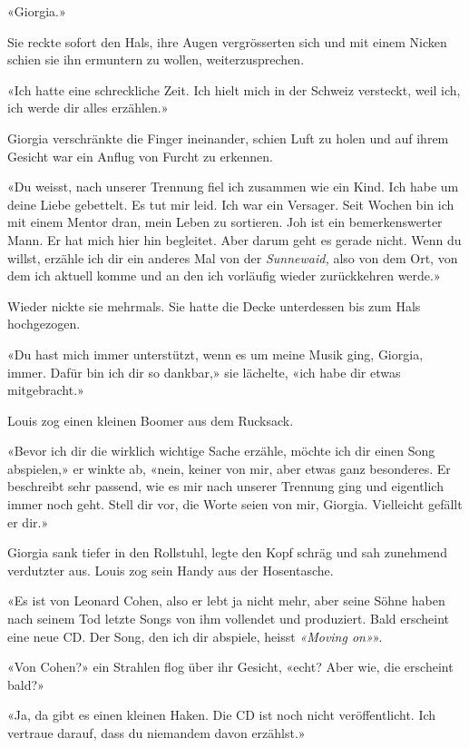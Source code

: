 «Giorgia.»

Sie reckte sofort den Hals, ihre Augen vergrösserten sich und mit einem
Nicken schien sie ihn ermuntern zu wollen, weiterzusprechen.

«Ich hatte eine schreckliche Zeit. Ich hielt mich in der Schweiz
versteckt, weil ich, ich werde dir alles erzählen.»

Giorgia verschränkte die Finger ineinander, schien Luft zu holen und auf
ihrem Gesicht war ein Anflug von Furcht zu erkennen.

«Du weisst, nach unserer Trennung fiel ich zusammen wie ein Kind. Ich
habe um deine Liebe gebettelt. Es tut mir leid. Ich war ein Versager.
Seit Wochen bin ich mit einem Mentor dran, mein Leben zu sortieren. Joh
ist ein bemerkenswerter Mann. Er hat mich hier hin begleitet. Aber darum
geht es gerade nicht. Wenn du willst, erzähle ich dir ein anderes Mal
von der \emph{Sunnewaid,} also von dem Ort, von dem ich aktuell komme
und an den ich vorläufig wieder zurückkehren werde.»

Wieder nickte sie mehrmals. Sie hatte die Decke unterdessen bis zum Hals hochgezogen.

«Du hast mich immer unterstützt, wenn es um meine Musik ging, Giorgia,
immer. Dafür bin ich dir so dankbar,» sie lächelte, «ich habe dir etwas
mitgebracht.»

Louis zog einen kleinen Boomer aus dem Rucksack.

«Bevor ich dir die wirklich wichtige Sache erzähle, möchte ich dir einen
Song abspielen,» er winkte ab, «nein, keiner von mir, aber etwas ganz
besonderes. Er beschreibt sehr passend, wie es mir nach unserer Trennung
ging und eigentlich immer noch geht. Stell dir vor, die Worte seien von
mir, Giorgia. Vielleicht gefällt er dir.»

Giorgia sank tiefer in den Rollstuhl, legte den Kopf schräg und sah
zunehmend verdutzter aus.
Louis zog sein Handy aus der Hosentasche.

«Es ist von Leonard Cohen, also er lebt ja nicht mehr, aber seine Söhne
haben nach seinem Tod letzte Songs von ihm vollendet und produziert.
Bald erscheint eine neue CD. Der Song, den ich dir abspiele, heisst
\emph{«Moving on»}».

«Von Cohen?» ein Strahlen flog über ihr Gesicht, «echt? Aber wie, die
erscheint bald?»

«Ja, da gibt es einen kleinen Haken. Die CD ist noch nicht
veröffentlicht. Ich vertraue darauf, dass du niemandem davon erzählst.»

